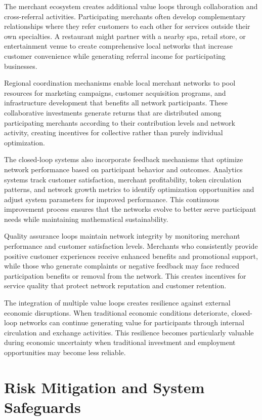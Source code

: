 \documentclass[
  Letterpaper,
]{scrbook}
\begin{document}
The merchant ecosystem creates additional value loops through
collaboration and cross-referral activities. Participating merchants
often develop complementary relationships where they refer customers to
each other for services outside their own specialties. A restaurant
might partner with a nearby spa, retail store, or entertainment venue to
create comprehensive local networks that increase customer convenience
while generating referral income for participating businesses.

Regional coordination mechanisms enable local merchant networks to pool
resources for marketing campaigns, customer acquisition programs, and
infrastructure development that benefits all network participants. These
collaborative investments generate returns that are distributed among
participating merchants according to their contribution levels and
network activity, creating incentives for collective rather than purely
individual optimization.

The closed-loop systems also incorporate feedback mechanisms that
optimize network performance based on participant behavior and outcomes.
Analytics systems track customer satisfaction, merchant profitability,
token circulation patterns, and network growth metrics to identify
optimization opportunities and adjust system parameters for improved
performance. This continuous improvement process ensures that the
networks evolve to better serve participant needs while maintaining
mathematical sustainability.

Quality assurance loops maintain network integrity by monitoring
merchant performance and customer satisfaction levels. Merchants who
consistently provide positive customer experiences receive enhanced
benefits and promotional support, while those who generate complaints or
negative feedback may face reduced participation benefits or removal
from the network. This creates incentives for service quality that
protect network reputation and customer retention.

The integration of multiple value loops creates resilience against
external economic disruptions. When traditional economic conditions
deteriorate, closed-loop networks can continue generating value for
participants through internal circulation and exchange activities. This
resilience becomes particularly valuable during economic uncertainty
when traditional investment and employment opportunities may become less
reliable.

\section{Risk Mitigation and System
Safeguards}\label{risk-mitigation-and-system-safeguards}
\end{document}
